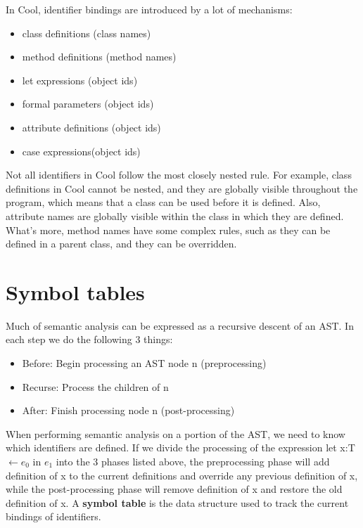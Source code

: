 In Cool, identifier bindings are introduced by a lot of mechanisms:
\begin{itemize}
\item class definitions (class names)
\item method definitions (method names)
\item let expressions (object ids)
\item formal parameters (object ids)
\item attribute definitions (object ids)
\item case expressions(object ids)
\end{itemize}
Not all identifiers in Cool follow the most closely nested rule. For example, class definitions in Cool cannot be nested, and they are globally visible throughout the program, which means that a class can be used before it is defined. Also, attribute names are globally visible within the class in which they are defined. What's more, method names have some complex rules, such as they can be defined in a parent class, and they can be overridden.
\section{Symbol tables}
Much of semantic analysis can be expressed as a recursive descent of an AST. In each step we do the following 3 things:
\begin{itemize}
\item Before: Begin processing an AST node n (preprocessing)
\item Recurse: Process the children of n
\item After: Finish processing node n (post-processing)
\end{itemize}
When performing semantic analysis on a portion of the AST, we need to know which identifiers are defined. If we divide the processing of the expression {\sf let x:T $\leftarrow e_0$ in $e_1$} into the 3 phases listed above, the preprocessing phase will add definition of x to the current definitions and override any previous definition of x, while the post-processing phase will remove definition of x and restore the old definition of x. A {\bf symbol table} is the data structure used to track the current bindings of identifiers. 

